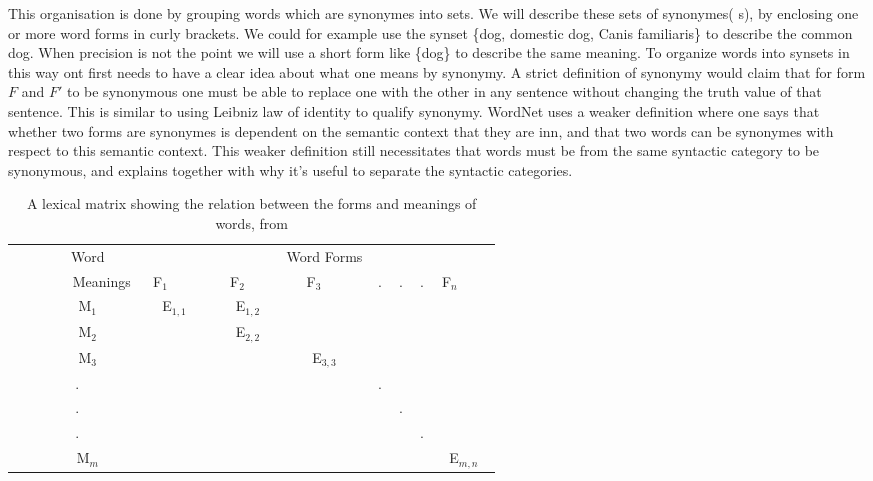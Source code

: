 This organisation is done by grouping words which are synonymes into sets.
We will describe these sets of synonymes( s), by enclosing one or more word forms in curly brackets.
We could for example use the synset \{dog, domestic dog, Canis familiaris\} to describe the common dog.
When precision is not the point we will use a short form like \{dog\} to describe the same meaning.
To organize words into synsets in this way ont first needs to have a clear idea about what one means by synonymy.
A strict definition of synonymy would claim that for form $F$ and $F'$ to be synonymous one must be able
to replace one with the other in any sentence without changing the truth value of that sentence.
This is similar to using Leibniz law of identity to qualify synonymy.
WordNet uses a weaker definition where one says that whether two forms are synonymes is dependent on the
semantic context that they are inn, and that two words can be synonymes with respect to this semantic context\citep{Miller1990}.
This weaker definition still necessitates that words must be from the same syntactic category to be synonymous,
and explains together with \citet{Fillenbaum1965} why it's useful to separate the syntactic categories.

\begin{table}[h]
	\centering
	\begin{tabular}{|c||ccccccc|}
		\hline
	        Word     & 	~		 & ~		 & Word Forms & ~ & ~ & ~ & ~		  \\
	        Meanings & F$_1$     & F$_2$     & F$_3$      & . & . & . & F$_n$     \\ \hline
	        M$_1$    & E$_{1,1}$ & E$_{1,2}$ & ~          & ~ & ~ & ~ & ~         \\
	        M$_2$    & ~         & E$_{2,2}$ & ~          & ~ & ~ & ~ & ~         \\
	        M$_3$    & ~         & ~         & E$_{3,3}$  & ~ & ~ & ~ & ~         \\
	        .        & ~         & ~         & ~          & . & ~ & ~ & ~         \\
	        .        & ~         & ~         & ~          & ~ & . & ~ & ~         \\
	        .        & ~         & ~         & ~          & ~ & ~ & . & ~         \\
	        M$_m$    & ~         & ~         & ~          & ~ & ~ & ~ & E$_{m,n}$ \\
		\hline
	\end{tabular}
	\caption{A lexical matrix showing the relation between the forms and meanings of words, from \citet{Miller1990}}
	\label{table:LexicalMatrix}
\end{table}

